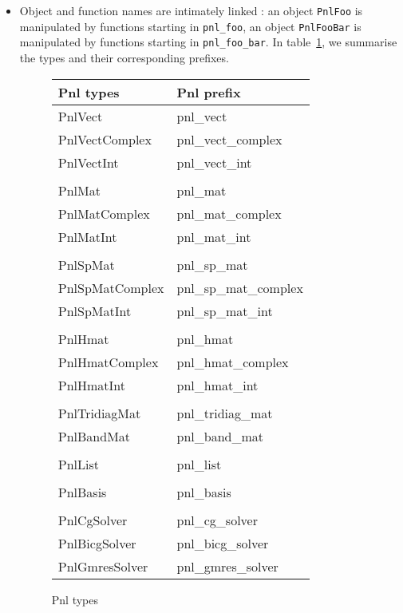 \documentclass[a4paper,11pt,twoside]{article}
\begin{document}
\begin{itemize}
  \item Object and function names are intimately linked : an object
    \verb!PnlFoo! is manipulated by functions starting in \verb!pnl_foo!, an
    object \verb!PnlFooBar! is manipulated by functions starting in
    \verb!pnl_foo_bar!. In table~\ref{pnltypes}, we summarise the types and their
    corresponding prefixes.

    \begin{figure}[h!]
      \centering\begin{tabular}{|l|l|}
      \hline
      Pnl types & Pnl prefix \\
      \hline
      PnlVect & pnl_vect \\
      PnlVectComplex & pnl_vect_complex \\
      PnlVectInt & pnl_vect_int \\
       &\\
      PnlMat & pnl_mat \\
      PnlMatComplex & pnl_mat_complex \\
      PnlMatInt & pnl_mat_int \\
      & \\
      PnlSpMat & pnl_sp_mat \\
      PnlSpMatComplex & pnl_sp_mat_complex \\
      PnlSpMatInt & pnl_sp_mat_int \\
      & \\
      PnlHmat & pnl_hmat \\
      PnlHmatComplex & pnl_hmat_complex \\
      PnlHmatInt & pnl_hmat_int \\
      & \\
      PnlTridiagMat & pnl_tridiag_mat \\
      PnlBandMat & pnl_band_mat \\
      & \\
      PnlList & pnl_list \\
      & \\
      PnlBasis & pnl_basis \\
      & \\
      PnlCgSolver & pnl_cg_solver \\
      PnlBicgSolver & pnl_bicg_solver \\
      PnlGmresSolver & pnl_gmres_solver \\
      \hline
    \end{tabular}
    \caption{Pnl types}
    \label{pnltypes}
  \end{figure}


\end{itemize}
\end{document}
